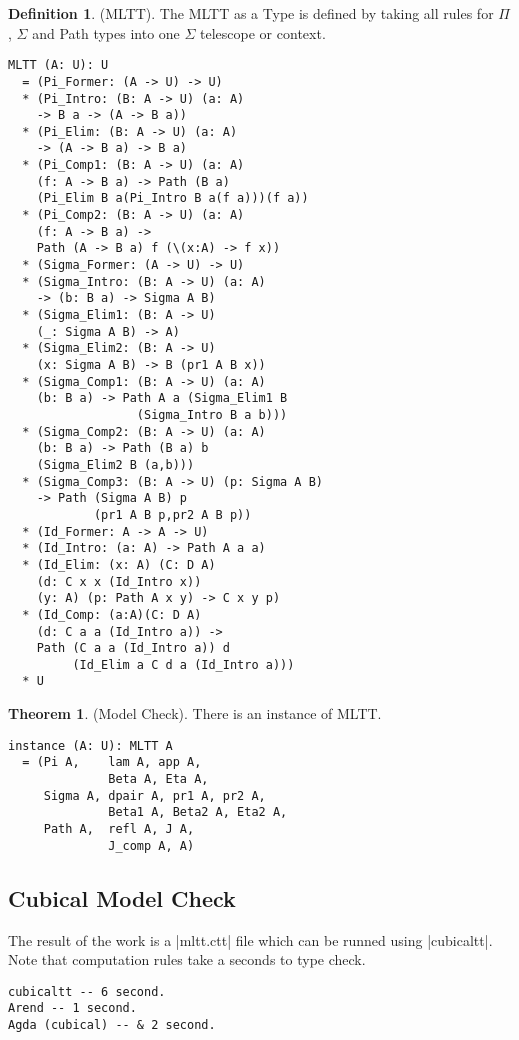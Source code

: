 \documentclass[twocolumn,10pt]{article}
\theoremstyle{definition}
\newtheorem{theorem}{Theorem}
\newtheorem{definition}{Definition}
\begin{document}
\begin{definition} (MLTT).
The MLTT as a Type is defined by taking all rules
for $\Pi$, $\Sigma$ and Path types into one $\Sigma$ telescope or context.
\begin{lstlisting}[mathescape=true]
MLTT (A: U): U
  = (Pi_Former: (A -> U) -> U)
  * (Pi_Intro: (B: A -> U) (a: A)
    -> B a -> (A -> B a))
  * (Pi_Elim: (B: A -> U) (a: A)
    -> (A -> B a) -> B a)
  * (Pi_Comp1: (B: A -> U) (a: A)
    (f: A -> B a) -> Path (B a)
    (Pi_Elim B a(Pi_Intro B a(f a)))(f a))
  * (Pi_Comp2: (B: A -> U) (a: A)
    (f: A -> B a) ->
    Path (A -> B a) f (\(x:A) -> f x))
  * (Sigma_Former: (A -> U) -> U)
  * (Sigma_Intro: (B: A -> U) (a: A)
    -> (b: B a) -> Sigma A B)
  * (Sigma_Elim1: (B: A -> U)
    (_: Sigma A B) -> A)
  * (Sigma_Elim2: (B: A -> U)
    (x: Sigma A B) -> B (pr1 A B x))
  * (Sigma_Comp1: (B: A -> U) (a: A)
    (b: B a) -> Path A a (Sigma_Elim1 B
                  (Sigma_Intro B a b)))
  * (Sigma_Comp2: (B: A -> U) (a: A)
    (b: B a) -> Path (B a) b
    (Sigma_Elim2 B (a,b)))
  * (Sigma_Comp3: (B: A -> U) (p: Sigma A B)
    -> Path (Sigma A B) p
            (pr1 A B p,pr2 A B p))
  * (Id_Former: A -> A -> U)
  * (Id_Intro: (a: A) -> Path A a a)
  * (Id_Elim: (x: A) (C: D A)
    (d: C x x (Id_Intro x))
    (y: A) (p: Path A x y) -> C x y p)
  * (Id_Comp: (a:A)(C: D A)
    (d: C a a (Id_Intro a)) ->
    Path (C a a (Id_Intro a)) d
         (Id_Elim a C d a (Id_Intro a)))
  * U
\end{lstlisting}
\end{definition}

\begin{theorem} (Model Check).
There is an instance of MLTT.
\begin{lstlisting}
instance (A: U): MLTT A
  = (Pi A,    lam A, app A,
              Beta A, Eta A,
     Sigma A, dpair A, pr1 A, pr2 A,
              Beta1 A, Beta2 A, Eta2 A,
     Path A,  refl A, J A,
              J_comp A, A)
\end{lstlisting}
\end{theorem}

\subsection*{Cubical Model Check}

The result of the work is a |mltt.ctt| file which can be runned using |cubicaltt|.
Note that computation rules take a seconds to type check.

\begin{lstlisting}
cubicaltt -- 6 second.
Arend -- 1 second.
Agda (cubical) -- & 2 second.
\end{lstlisting}
\end{document}
